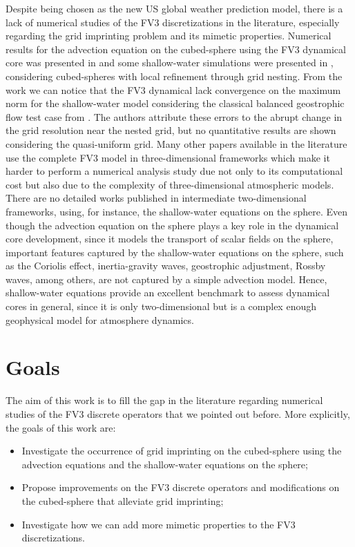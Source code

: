 Despite being chosen as the new US global weather prediction model,
there is a lack of numerical studies of the FV3 discretizations in the literature,
especially regarding the grid imprinting problem and its mimetic properties.
Numerical results for the advection equation on the cubed-sphere using the
FV3 dynamical core was presented in \citet{putman:2007} and some shallow-water 
simulations were presented in \citet{harris:2013}, considering cubed-spheres
with local refinement through grid nesting.
From the work \citet{harris:2013} we can notice that the FV3 dynamical
lack convergence on the maximum norm for the shallow-water model considering
the classical balanced geostrophic flow test case from \citet{will:1992}.
The authors attribute these errors to the abrupt change in the grid resolution
near the nested grid, but no quantitative results are shown considering the quasi-uniform grid.
Many other papers available in the literature use the complete FV3 model in three-dimensional
frameworks which make it harder to perform a numerical analysis study due not only to its computational cost
but also due to the complexity of three-dimensional atmospheric models.
There are no detailed works published in intermediate two-dimensional frameworks, using, for 
instance, the shallow-water equations on the sphere.
Even though the advection equation on the sphere plays a key role in the dynamical core development,
since it models the transport of scalar fields on the sphere, important features captured by the shallow-water
equations on the sphere, such as the Coriolis effect, inertia-gravity waves, geostrophic adjustment, Rossby waves,
among others, are not captured by a simple advection model.
Hence, shallow-water equations provide an excellent benchmark to assess dynamical cores in general,
since it is only two-dimensional but is a complex enough geophysical model for atmosphere dynamics.
\section{Goals}
The aim of this work is to fill the gap in the literature regarding numerical studies of the FV3 
discrete operators that we pointed out before.
More explicitly, the goals of this work are:
\begin{itemize}
  \item Investigate the occurrence of grid imprinting on the cubed-sphere using the advection equations and
    the shallow-water equations on the sphere;
  \item Propose improvements on the FV3 discrete operators and modifications on the cubed-sphere that alleviate
    grid imprinting;
  \item Investigate how we can add more mimetic properties to the FV3 discretizations.
\end{itemize}

